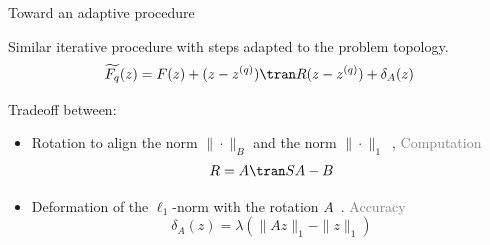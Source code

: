 \documentclass[ignorenonframetext]{beamer}
\def\keypoint#1{\hfill\textcolor{gray}{#1}}
\begin{document}
\begin{frame}{Toward an adaptive procedure}
	

	Similar iterative procedure with steps adapted to the problem topology.\\[1em]
	\[
		\widetilde{F_q}(z) = F(z) + (z-z^{(q)})\tran R(z-z^{(q)}) + \delta_A(z)
	\]


	Tradeoff between:\\[.3em]
	\begin{itemize}\itemsep1em
		\item Rotation to align the norm $\|\cdot\|_B$ and the norm $\|\cdot\|_1$~,
		\keypoint{Computation}
		\[ R = A\tran SA - B\]
		\item Deformation of the $\ell_1$-norm with the rotation $A$~.
		\keypoint{Accuracy}
		\[ \delta_A(z) = \lambda\left(\|Az\|_1-\|z\|_1\right) \]
	\end{itemize}
	
\end{frame}


\end{document}

